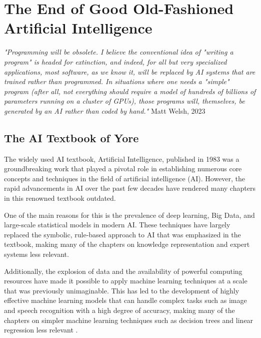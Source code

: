 \setchapterpreamble[u]{\margintoc}
\chapter{The End of Good Old-Fashioned Artificial Intelligence}

\textit{"Programming will be obsolete. I believe the conventional idea of "writing a program" is headed for extinction, and indeed, for all but very specialized applications, most software, as we know it, will be replaced by AI systems that are trained rather than programmed. In situations where one needs a "simple" program (after all, not everything should require a model of hundreds of billions of parameters running on a cluster of GPUs), those programs will, themselves, be generated by an AI rather than coded by hand."} Matt Welsh, 2023 \cite{welsh2023}

\section{The AI Textbook of Yore}

The widely used AI textbook, Artificial Intelligence, published in 1983 was a groundbreaking work that played a pivotal role in establishing numerous core concepts and techniques in the field of artificial intelligence (AI). However, the rapid advancements in AI over the past few decades have rendered many chapters in this renowned textbook outdated.

One of the main reasons for this is the prevalence of deep learning, Big Data, and large-scale statistical models in modern AI. These techniques have largely replaced the symbolic, rule-based approach to AI that was emphasized in the textbook, making many of the chapters on knowledge representation and expert systems less relevant.

Additionally, the explosion of data and the availability of powerful computing resources have made it possible to apply machine learning techniques at a scale that was previously unimaginable. This has led to the development of highly effective machine learning models that can handle complex tasks such as image and speech recognition with a high degree of accuracy, making many of the chapters on simpler machine learning techniques such as decision trees and linear regression less relevant .

